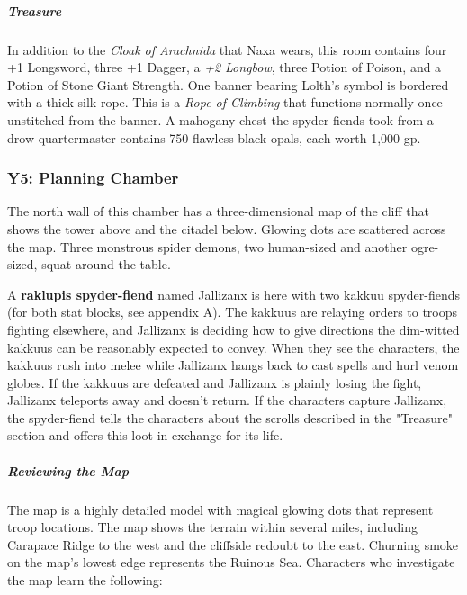 \documentclass[10pt,a4paper,twoside,bg=print,twocolumn,openany,nodeprecatedcode]{dndbook}
\begin{document}
\subparagraph{Treasure}
In addition to the \textit{Cloak of Arachnida} that Naxa wears, this room contains four +1 Longsword, three +1 Dagger, a \textit{+2 Longbow}, three Potion of Poison, and a Potion of Stone Giant Strength. One banner bearing Lolth's symbol is bordered with a thick silk rope. This is a \textit{Rope of Climbing} that functions normally once unstitched from the banner. A mahogany chest the spyder-fiends took from a drow quartermaster contains 750 flawless black opals, each worth 1,000 gp.

\subsubsection{Y5: Planning Chamber}
\begin{DndReadAloud}{}
The north wall of this chamber has a three-dimensional map of the cliff that shows the tower above and the citadel below. Glowing dots are scattered across the map. Three monstrous spider demons, two human-sized and another ogre-sized, squat around the table.

\end{DndReadAloud}

A \textbf{raklupis spyder-fiend} named Jallizanx is here with two kakkuu spyder-fiends (for both stat blocks, see appendix A). The kakkuus are relaying orders to troops fighting elsewhere, and Jallizanx is deciding how to give directions the dim-witted kakkuus can be reasonably expected to convey. When they see the characters, the kakkuus rush into melee while Jallizanx hangs back to cast spells and hurl venom globes. If the kakkuus are defeated and Jallizanx is plainly losing the fight, Jallizanx teleports away and doesn't return. If the characters capture Jallizanx, the spyder-fiend tells the characters about the scrolls described in the "Treasure" section and offers this loot in exchange for its life.

\subparagraph{Reviewing the Map}
The map is a highly detailed model with magical glowing dots that represent troop locations. The map shows the terrain within several miles, including Carapace Ridge to the west and the cliffside redoubt to the east. Churning smoke on the map's lowest edge represents the Ruinous Sea. Characters who investigate the map learn the following:
\end{document}
